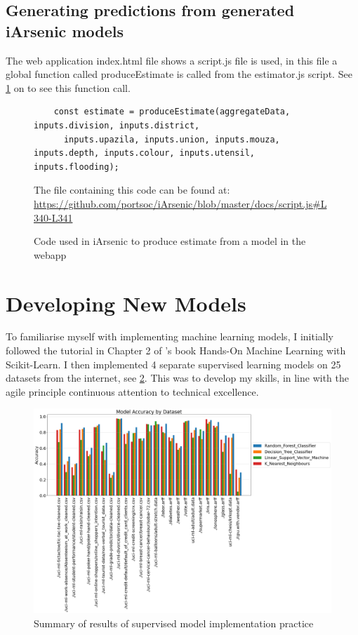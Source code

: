 \subsection{Generating predictions from generated iArsenic models}

The web application index.html file shows a script.js file is used, in this file a global function called produceEstimate is called from the estimator.js script. See \ref{fig:x produce_estimate_call} on \pageref{fig:x produce_estimate_call} to see this function call.

\begin{figure}
    \begin{verbatim}
    const estimate = produceEstimate(aggregateData, inputs.division, inputs.district,
      inputs.upazila, inputs.union, inputs.mouza, inputs.depth, inputs.colour, inputs.utensil, inputs.flooding);
    \end{verbatim}
    \caption{Code used in iArsenic to produce estimate from a model in the webapp}
    \label{fig:x produce_estimate_call}
    \small The file containing this code can be found at: \url{https://github.com/portsoc/iArsenic/blob/master/docs/script.js#L340-L341}
\end{figure}

\section{Developing New Models}

To familiarise myself with implementing machine learning models, I initially followed the tutorial in Chapter 2 of \cite{Aurélien2017}'s book Hands-On Machine Learning with Scikit-Learn. I then implemented 4 separate supervised learning models on 25 datasets from the internet, see \ref{fig:x 4_m_25_d}. This was to develop my skills, in line with the agile principle continuous attention to technical excellence.

\begin{landscape}
    \begin{figure}[ht]
        \centering
        \includegraphics[scale=0.375]{figures/4_models_25_datasets.png} 
        \caption{Summary of results of supervised model implementation practice}
        \label{fig:x 4_m_25_d}
    \end{figure}
\end{landscape}


